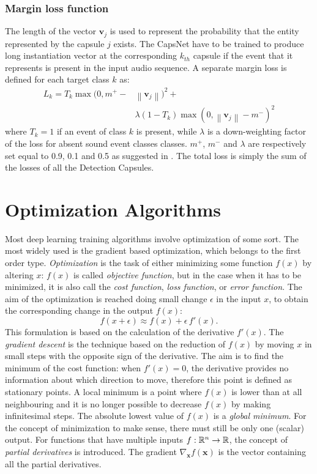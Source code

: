 \subsubsection{Margin loss function}
The length of the vector $\mathbf{v}_j$ is used to represent the probability that the entity represented by the capsule $j$
exists.
The CapsNet have to be trained to produce long instantiation vector at the corresponding $k_{th}$ capsule if the event that it represents is present in the input audio sequence.
A separate margin loss is defined for each target class $k$ as:
\begin{equation}
\begin{split}
L_k = T_k \max(0, m^+ - & \left \|\mathbf{v}_j \right \|)^2 + \\
&\lambda(1 - T_k)\max(0, \left \|\mathbf{v}_j \right \| - m^-)^2
\end{split}
\end{equation}
where $T_k = 1$ if an event of class $k$ is present, while $\lambda$ is a down-weighting factor of the loss for absent sound event classes classes. 
$m^+$, $ m^-$ and $\lambda$ are respectively set equal to 0.9, 0.1 and 0.5 as suggested in \cite{sabour2017dynamic}.
The total loss is simply the sum of the losses of all the Detection Capsules.



\section{Optimization Algorithms}

Most deep learning training algorithms involve optimization of some sort.
The most widely used is the gradient based optimization, which belongs to the first order type.
\textit{Optimization} is the task of either minimizing some function $f(x)$ by altering $x$:
$f(x)$ is called \textit{objective function}, but in the case when it has to be minimized, it is also call the \textit{cost function}, \textit{loss function}, or \textit{error function}.
The aim of the optimization is reached doing small change $\epsilon$ in the input $x$, to obtain the corresponding change in the output $f(x)$:
\begin{equation}
f(x+\epsilon) \approx f(x)+\epsilon\,f'(x).
\end{equation}
This formulation is based on the calculation of the derivative $f'(x)$.
The \textit{gradient descent} is the technique based on the reduction of $f(x)$ by moving $x$ in small steps with the opposite sign of the derivative.
The aim is to find the minimum of the cost function: when $f'(x)=0$, the derivative provides no information about which direction to move, therefore this point is defined as stationary points.
A local minimum is a point where $f(x)$ is lower than at all neighbouring and it is no longer possible to decrease $f(x)$ by making infinitesimal steps.
The absolute lowest value of $f(x)$ is a \textit{global minimum}.
For the concept of minimization to make sense, there must still be only one (scalar) output.
For functions that have multiple inputs $f: {\mathbb{R}}^n \rightarrow {\mathbb{R}}$, the concept of \textit{partial derivatives} is introduced.
The gradient $\nabla_{\mathbf{x}}f(\mathbf{x})$ is the vector containing all the partial derivatives.


